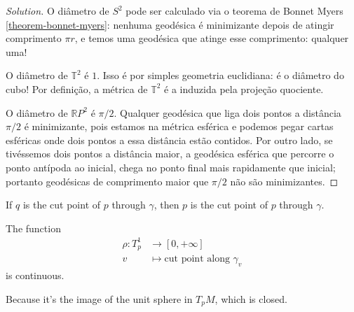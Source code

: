 \begin{proof}[Solution]
O diâmetro de $S^2$ pode ser calculado via o teorema de Bonnet Myers
\ref{theorem-bonnet-myers}: nenhuma geodésica é minimizante depois de atingir
comprimento $\pi r$, e temos uma geodésica que atinge esse comprimento: qualquer
uma!

O diâmetro de $\mathbb{T}^2$ é $1$. Isso é por simples geometria
euclidiana: é o diâmetro do cubo! Por definição, a métrica de  $\mathbb{T}^2$ é
a induzida pela projeção quociente.

O diâmetro de $\mathbb{R}P^{2}$ é $\pi/2$. Qualquer geodésica que liga dois
pontos a distância $\pi/2$ é minimizante, pois estamos na métrica esférica e
podemos pegar cartas esféricas onde dois pontos a essa distância estão contidos. 
Por outro lado, se tivéssemos dois pontos a distância maior, a geodésica 
esférica que percorre o ponto antípoda ao inicial, chega no ponto final mais 
rapidamente que inicial; portanto geodésicas de comprimento maior que $\pi/2$ 
não são minimizantes.
\end{proof}

\begin{lemma}
\label{lemma-cut-point-reflexive}
If $q$ is the cut point of $p$ through $\gamma$, then $p$ is the cut point of
$p$ through $\gamma$.
\end{lemma}

\begin{lemma}
\label{lemma-not-cut-locus-minimizing}

\end{lemma}

\begin{proposition}\leavevmode
The function
\begin{align*}
	\rho: T^1_p &\longrightarrow [0,+\infty] \\
	v &\longmapsto \text{cut point along }\gamma_v 
\end{align*}
is continuous.
\end{proposition}

\begin{lemma}
\label{lemma-cut-locus-closed}
Because it's the image of the unit sphere in $T_pM$, which is closed.
\end{lemma}

\begin{lemma}
\label{lemma-cut-locus-topology}

\end{lemma}

